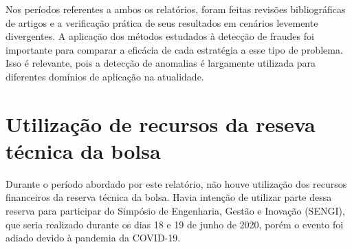 \documentclass[11pt]{article}
\begin{document}
Nos períodos referentes a ambos os relatórios, foram feitas revisões bibliográficas de artigos e a verificação prática de seus resultados em cenários levemente divergentes. A aplicação dos métodos estudados à detecção de fraudes foi importante para comparar a eficácia de cada estratégia a esse tipo de problema. Isso é relevante, pois a detecção de anomalias é largamente utilizada para diferentes domínios de aplicação na atualidade.


\newpage

\section*{Utilização de recursos da reseva técnica da bolsa}

Durante o período abordado por este relatório, não houve utilização dos recursos financeiros da reserva técnica da bolsa.
Havia intenção de utilizar parte dessa reserva para participar do Simpósio de Engenharia, Gestão e Inovação (SENGI), que seria realizado durante os dias 18 e 19 de junho de 2020, porém o evento foi adiado devido à pandemia da COVID-19.

\newpage

\printbibliography
\end{document}

